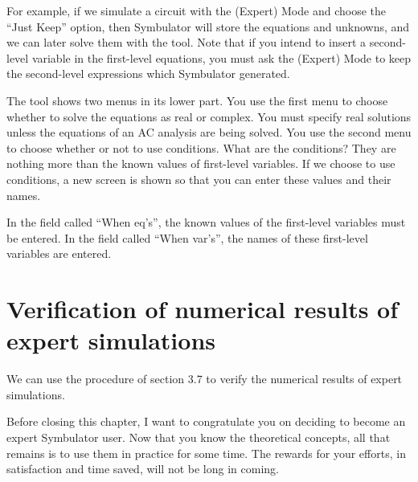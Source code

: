 For example, if we simulate a circuit with the (Expert) Mode and
choose the ``Just Keep'' option, then Symbulator will store the
equations and unknowns, and we can later solve them with the
 tool. Note that if you intend to insert a second-level
variable in the first-level equations, you must ask the (Expert)
Mode to keep the second-level expressions which Symbulator
generated.

The  tool shows two menus in its lower part. You use
the first menu to choose whether to solve the equations as real or
complex. You must specify real solutions unless the equations of an
AC analysis are being solved. You use the second menu to choose
whether or not to use conditions. What are the conditions? They are
nothing more than the known values of first-level variables. If we
choose to use conditions, a new screen is shown so that you can
enter these values and their names.

In the field called ``When eq's'', the known values of the
first-level variables must be entered. In the field called ``When
var's'', the names of these first-level variables are entered.

\section{Verification of numerical results of expert simulations}

We can use the procedure of section 3.7 to verify the numerical
results of expert simulations.

Before closing this chapter, I want to congratulate you on deciding
to become an expert Symbulator user. Now that you know the
theoretical concepts, all that remains is to use them in practice
for some time. The rewards for your efforts, in satisfaction and
time saved, will not be long in coming.
